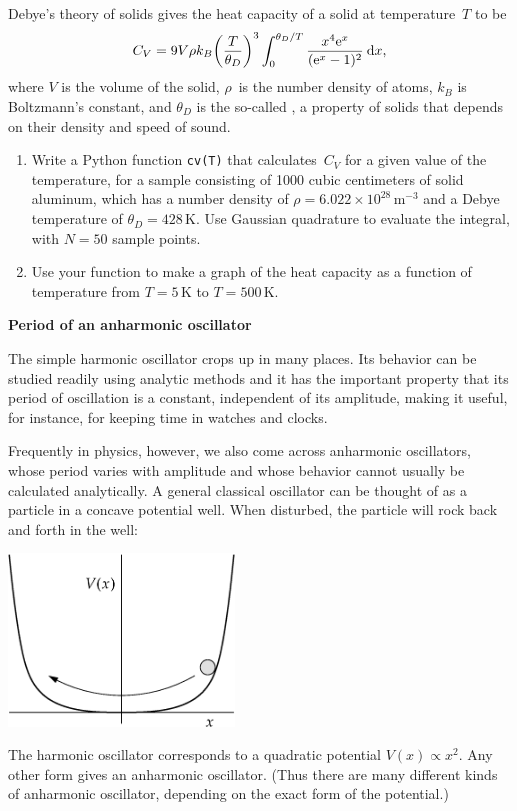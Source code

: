\documentclass[12pt]{article}
\begin{document}
\begin{exercises}
\exskip Debye's theory of solids gives the heat capacity of a solid at
temperature~$T$ to be
\begin{displaymath}
C_V = 9V\rho k_B \biggl( {T\over\theta_D} \biggr)^3 \int_0^{\theta_D/T}
      {x^4 \mathrm{e}^x\over(\mathrm{e}^x-1)^2}\>\mathrm{d} x,
\end{displaymath}
where $V$ is the volume of the solid, $\rho$~is the number density of
atoms, $k_B$ is Boltzmann's constant, and $\theta_D$ is the so-called
, a property of solids that depends on their
density and speed of sound.
\begin{enumerate}\setlength{\itemsep}{0pt}
\item Write a Python function \verb|cv(T)| that calculates~$C_V$ for a
  given value of the temperature, for a sample consisting of 1000 cubic
  centimeters of solid aluminum, which has a number density of
  $\rho=6.022\times10^{28}\,\mathrm{m}^{-3}$ and a Debye temperature of
  $\theta_D=428\,$K.  Use Gaussian quadrature to evaluate the integral,
  with $N=50$ sample points.
\item Use your function to make a graph of the heat capacity as a function
  of temperature from $T=5\,$K to $T=500\,$K.
\end{enumerate}



\exercise \textbf{Period of an anharmonic oscillator}

\exskip The simple harmonic oscillator crops up in many places.  Its
behavior can be studied readily using analytic methods and it has the
important property that its period of oscillation is a constant,
independent of its amplitude, making it useful, for instance, for keeping
time in watches and clocks.

Frequently in physics, however, we also come across anharmonic oscillators,
whose period varies with amplitude and whose behavior cannot usually be
calculated analytically.  A general classical oscillator can be thought of
as a particle in a concave potential well.  When disturbed, the particle
will rock back and forth in the well: \bigskip
\begin{center}
\includegraphics[width=6cm]{anharmonic.eps}
\end{center}
The harmonic oscillator corresponds to a quadratic potential $V(x) \propto
x^2$.  Any other form gives an anharmonic oscillator.  (Thus there are many
different kinds of anharmonic oscillator, depending on the exact form of
the potential.)


\end{exercises}
\end{document}
